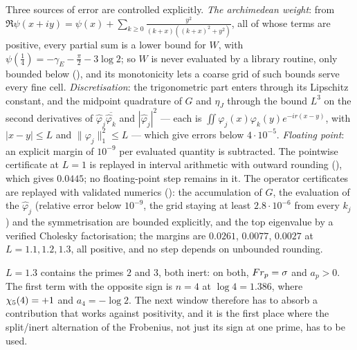 \begin{remark}\label{rmk:rigour}
Three sources of error are controlled explicitly.  \emph{The archimedean weight}:
from $\Re\psi(x+iy)=\psi(x)+\sum_{k\ge0}\frac{y^2}{(k+x)((k+x)^2+y^2)}$, all of whose
terms are positive, every partial sum is a lower bound for $W$, with
$\psi(\tfrac14)=-\gamma_E-\frac\pi2-3\log2$; so $W$ is never evaluated by a
library routine, only bounded below (), and its monotonicity lets
a coarse grid of such bounds serve every fine cell.  \emph{Discretisation}: the
trigonometric part enters through its Lipschitz constant, and the midpoint quadrature of $G$ and $\eta_J$ through the bound $L^3$ on the second derivatives of $\hat\varphi_j\overline{\hat\varphi_k}$ and $|\hat\varphi_j|^2$ --- each is $\iint\varphi_j(x)\varphi_k(y)e^{-ir(x-y)}$, with $|x-y|\le L$ and $\|\varphi_j\|_1^2\le L$ --- which give errors below $4\cdot10^{-5}$.  \emph{Floating point}: an explicit margin of $10^{-9}$ per
evaluated quantity is subtracted.  The pointwise certificate at $L=1$ is replayed in interval arithmetic with outward rounding (), which gives $0.0445$; no floating-point step remains in it.  The operator certificates are replayed with validated numerics (): the accumulation of $G$, the evaluation of the $\hat\varphi_j$ (relative error below $10^{-9}$, the grid staying at least $2.8\cdot10^{-6}$ from every $k_j$) and the symmetrisation are bounded explicitly, and the top eigenvalue by a verified Cholesky factorisation; the margins are $0.0261$, $0.0077$, $0.0027$ at $L=1.1,1.2,1.3$, all positive, and no step depends on unbounded rounding.
\end{remark}

\begin{remark}
$L=1.3$ contains the primes $2$ and $3$, both inert: on both, $Fr_p=\sigma$ and
$a_p>0$.  The first term with the opposite sign is $n=4$ at $\log4=1.386$, where
$\chi_5(4)=+1$ and $a_4=-\log2$.  The next window therefore has to absorb a
contribution that works against positivity, and it is the first place where the
split/inert alternation of the Frobenius, not just its sign at one prime, has to
be used.
\end{remark}

